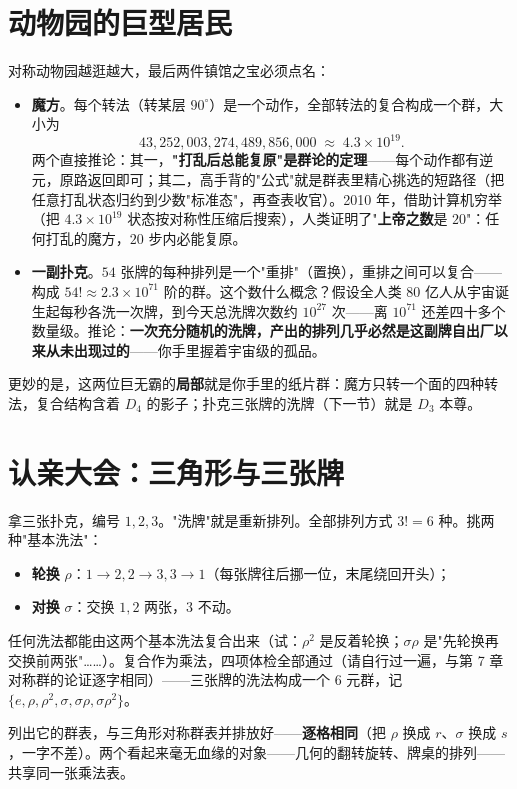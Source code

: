 \section{动物园的巨型居民}

对称动物园越逛越大，最后两件镇馆之宝必须点名：

\begin{itemize}
\item \textbf{魔方}。每个转法（转某层 $90^\circ$）是一个动作，全部转法的复合构成一个群，大小为
\[
43{,}252{,}003{,}274{,}489{,}856{,}000 \;\approx\; 4.3\times10^{19}.
\]
两个直接推论：其一，\textbf{"打乱后总能复原"是群论的定理}——每个动作都有逆元，原路返回即可；其二，高手背的"公式"就是群表里精心挑选的短路径（把任意打乱状态归约到少数"标准态"，再查表收官）。2010 年，借助计算机穷举（把 $4.3\times10^{19}$ 状态按对称性压缩后搜索），人类证明了"\textbf{上帝之数}是 $20$"：任何打乱的魔方，$20$ 步内必能复原。
\item \textbf{一副扑克}。$54$ 张牌的每种排列是一个"重排"（置换），重排之间可以复合——构成 $54! \approx 2.3\times10^{71}$ 阶的群。这个数什么概念？假设全人类 $80$ 亿人从宇宙诞生起每秒各洗一次牌，到今天总洗牌次数约 $10^{27}$ 次——离 $10^{71}$ 还差四十多个数量级。推论：\textbf{一次充分随机的洗牌，产出的排列几乎必然是这副牌自出厂以来从未出现过的}——你手里握着宇宙级的孤品。
\end{itemize}

更妙的是，这两位巨无霸的\textbf{局部}就是你手里的纸片群：魔方只转一个面的四种转法，复合结构含着 $D_4$ 的影子；扑克三张牌的洗牌（下一节）就是 $D_3$ 本尊。

\section{认亲大会：三角形与三张牌}

拿三张扑克，编号 $1, 2, 3$。"洗牌"就是重新排列。全部排列方式 $3! = 6$ 种。挑两种"基本洗法"：
\begin{itemize}
\item \textbf{轮换} $\rho$：$1\to2, 2\to3, 3\to1$（每张牌往后挪一位，末尾绕回开头）；
\item \textbf{对换} $\sigma$：交换 $1, 2$ 两张，$3$ 不动。
\end{itemize}
任何洗法都能由这两个基本洗法复合出来（试：$\rho^2$ 是反着轮换；$\sigma\rho$ 是"先轮换再交换前两张"……）。复合作为乘法，四项体检全部通过（请自行过一遍，与第 7 章对称群的论证逐字相同）——三张牌的洗法构成一个 $6$ 元群，记 $\{e, \rho, \rho^2, \sigma, \sigma\rho, \sigma\rho^2\}$。

列出它的群表，与三角形对称群表并排放好——\textbf{逐格相同}（把 $\rho$ 换成 $r$、$\sigma$ 换成 $s$，一字不差）。两个看起来毫无血缘的对象——几何的翻转旋转、牌桌的排列——共享同一张乘法表。

